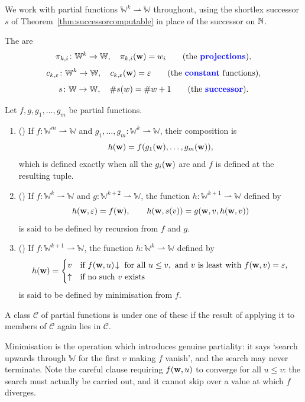 \documentclass[a4paper]{scrartcl}
\newcommand{\WW}{\mathbb{W}}
\newcommand{\eps}{\varepsilon}
\begin{document}
We work with partial functions $\WW^k \rightharpoonup \WW$ throughout, using the shortlex successor $s$ of Theorem~\ref{thm:successorcomputable} in place of the successor on $\mathbb{N}$.

\begin{definition}
	The  are
	$$\pi_{k,i} \colon \WW^k \to \WW, \quad \pi_{k,i}(\vv w) = w_i \qquad (\text{the \vocab{projections}}),$$
	$$c_{k,\eps} \colon \WW^k \to \WW, \quad c_{k,\eps}(\vv w) = \eps \qquad (\text{the \vocab{constant} functions}),$$
	$$s \colon \WW \to \WW, \quad \#s(w) = \#w + 1 \qquad (\text{the \vocab{successor}}).$$
\end{definition}

\begin{definition}
	Let $f, g, g_1, \dots, g_m$ be partial functions.
	\begin{enumerate}[label=(\roman*)]
		\item () If $f \colon \WW^m\rightharpoonup\WW$ and $g_1,\dots,g_m \colon \WW^k \rightharpoonup \WW$, their composition is
		$$h(\mathbf{w}) = f(g_1(\mathbf{w}), \dots, g_m(\mathbf{w})),$$
		which is defined exactly when all the $g_i(\mathbf{w})$ are and $f$ is defined at the resulting tuple.
		\item () If $f \colon \WW^k\rightharpoonup\WW$ and $g\colon\WW^{k+2}\rightharpoonup\WW$, the function $h \colon \WW^{k+1}\rightharpoonup\WW$ defined by
		$$h(\vv w, \eps) = f(\vv w), \qquad h(\vv w, s(v)) = g(\vv w, v, h(\vv w, v))$$
		is said to be defined by recursion from $f$ and $g$.
		\item () If $f\colon\WW^{k+1}\rightharpoonup\WW$, the function $h \colon \WW^k\rightharpoonup\WW$ defined by
		$$h(\vv w) = \begin{cases} v & \text{if } f(\vv w, u)\!\downarrow \text{ for all } u \leq v, \text{ and } v \text{ is least with } f(\vv w, v) = \eps, \\ \uparrow & \text{if no such } v \text{ exists}\end{cases}$$
		is said to be defined by minimisation from $f$.
	\end{enumerate}
	A class $\mathcal C$ of partial functions is  under one of these if the result of applying it to members of $\mathcal C$ again lies in $\mathcal C$.
\end{definition}

Minimisation is the operation which introduces genuine partiality: it says `search upwards through $\WW$ for the first $v$ making $f$ vanish', and the search may never terminate. Note the careful clause requiring $f(\mathbf{w},u)$ to converge for all $u \leq v$: the search must actually be carried out, and it cannot skip over a value at which $f$ diverges.
\end{document}
